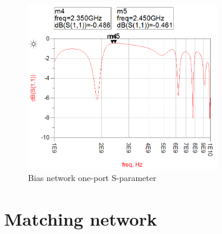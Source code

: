   \begin{figure}[h]
	  \label{fig:Biasones}
	  \centering
	  \includegraphics[width=0.75\textwidth]{img/Bias_filter_one_port_s_parm}
	  \caption{Bias network one-port S-parameter}
  \end{figure}

  \section{Matching network}
